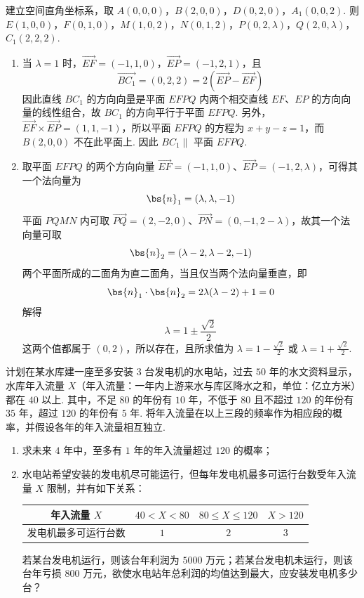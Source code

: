 \begin{solution}
建立空间直角坐标系，取 \(A(0,0,0)\)，\(B(2,0,0)\)，\(D(0,2,0)\)，\(A_1(0,0,2)\). 则 \(E(1,0,0)\)，\(F(0,1,0)\)，\(M(1,0,2)\)，\(N(0,1,2)\)，\(P(0,2,\lambda)\)，\(Q(2,0,\lambda)\)，\(C_1(2,2,2)\).
\begin{enumerate}
\item 当 \(\lambda=1\) 时，\(\overrightarrow{EF}=(-1,1,0)\)，\(\overrightarrow{EP}=(-1,2,1)\)，且
\[
\overrightarrow{BC_1}=(0,2,2)=2\left(\overrightarrow{EP}-\overrightarrow{EF}\right)
\]
因此直线 \(BC_1\) 的方向向量是平面 \(EFPQ\) 内两个相交直线 \(EF\)、\(EP\) 的方向向量的线性组合，故 \(BC_1\) 的方向平行于平面 \(EFPQ\). 另外，\(\overrightarrow{EF}\times\overrightarrow{EP}=(1,1,-1)\)，所以平面 \(EFPQ\) 的方程为 \(x+y-z=1\)，而 \(B(2,0,0)\) 不在此平面上. 因此 \(BC_1\parallel\) 平面 \(EFPQ\).
\item 取平面 \(EFPQ\) 的两个方向向量 \(\overrightarrow{EF}=(-1,1,0)\)、\(\overrightarrow{EP}=(-1,2,\lambda)\)，可得其一个法向量为
\[
\bs{n}_1=(\lambda,\lambda,-1)
\]
平面 \(PQMN\) 内可取 \(\overrightarrow{PQ}=(2,-2,0)\)、\(\overrightarrow{PN}=(0,-1,2-\lambda)\)，故其一个法向量可取
\[
\bs{n}_2=(\lambda-2,\lambda-2,-1)
\]
两个平面所成的二面角为直二面角，当且仅当两个法向量垂直，即
\[
\bs{n}_1\cdot\bs{n}_2=2\lambda(\lambda-2)+1=0
\]
解得
\[
\lambda=1\pm\frac{\sqrt2}{2}
\]
这两个值都属于 \((0,2)\)，所以存在，且所求值为 \(\lambda=1-\frac{\sqrt2}{2}\) 或 \(\lambda=1+\frac{\sqrt2}{2}\).
\end{enumerate}
\end{solution}

\begin{problem}
计划在某水库建一座至多安装 \(3\text{ 台}\)发电机的水电站，过去 \(50\text{ 年}\)的水文资料显示，水库年入流量 \(X\)（年入流量：一年内上游来水与库区降水之和，单位：\(\text{亿立方米}\)）都在 \(40\) 以上. 其中，不足 \(80\) 的年份有 \(10\text{ 年}\)，不低于 \(80\) 且不超过 \(120\) 的年份有 \(35\text{ 年}\)，超过 \(120\) 的年份有 \(5\text{ 年}\). 将年入流量在以上三段的频率作为相应段的概率，并假设各年的年入流量相互独立.
\begin{enumerate}
\item 求未来 \(4\text{ 年}\)中，至多有 \(1\text{ 年}\)的年入流量超过 \(120\) 的概率；
\item 水电站希望安装的发电机尽可能运行，但每年发电机最多可运行台数受年入流量 \(X\) 限制，并有如下关系：

\begin{center}
\begin{tabular}{c|ccc}
\hline
年入流量 \(X\) & \(40<X<80\) & \(80\leqslant X\leqslant 120\) & \(X>120\) \\
\hline
发电机最多可运行台数 & \(1\) & \(2\) & \(3\) \\
\hline
\end{tabular}
\end{center}

若某台发电机运行，则该台年利润为 \(5000\text{ 万元}\)；若某台发电机未运行，则该台年亏损 \(800\text{ 万元}\)，欲使水电站年总利润的均值达到最大，应安装发电机多少台？
\end{enumerate}
\end{problem}

